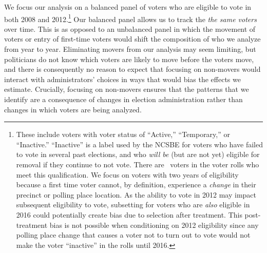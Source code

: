 \documentclass[12pt]{article}
\begin{document}
We focus our analysis on a balanced panel of voters who are eligible to vote in both 2008 and 2012.\footnote{These include voters with voter status of ``Active,'' ``Temporary,'' or ``Inactive.'' ``Inactive'' is a label used by the NCSBE for voters who have failed to vote in several past elections, and who \emph{will be} (but are not yet) eligible for removal if they continue to not vote. There are \unskip~voters in the voter rolls who meet this qualification. We focus on voters with two years of eligibility because a first time voter cannot, by definition, experience a \emph{change} in their precinct or polling place location. As the ability to vote in 2012 may impact subsequent eligibility to vote, subsetting for voters who are \emph{also} eligible in 2016 could potentially create bias due to selection after treatment.  This post-treatment bias is not possible when conditioning on 2012 eligibility since any polling place change that causes a voter not to turn out to vote would not make the voter ``inactive'' in the rolls until 2016. } Our balanced panel allows us to track the \emph{the same voters} over time.  This is as opposed to an unbalanced panel in which the movement of voters or entry of first-time voters would shift the composition of who we analyze from year to year.  Eliminating movers from our analysis may seem limiting, but politicians do not know which voters are likely to move before the voters move, and there is consequently no reason to expect that focusing on non-movers would interact with administrators' choices in ways that would bias the effects we estimate. Crucially, focusing on non-movers ensures that the patterns that we identify are a consequence of changes in election administration rather than changes in which voters are being analyzed.  %

\end{document}
